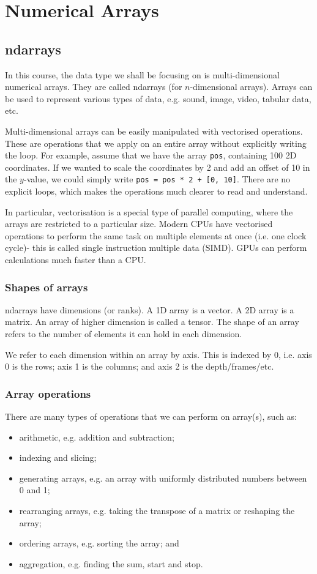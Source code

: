 \documentclass[a4paper, openany]{memoir}
\begin{document}
    \chapter{Numerical Arrays}
    \section{ndarrays}
    In this course, the data type we shall be focusing on is multi-dimensional numerical arrays. They are called ndarrays (for $n$-dimensional arrays). Arrays can be used to represent various types of data, e.g. sound, image, video, tabular data, etc.

    Multi-dimensional arrays can be easily manipulated with vectorised operations. These are operations that we apply on an entire array without explicitly writing the loop. For example, assume that we have the array \texttt{pos}, containing 100 2D coordinates. If we wanted to scale the coordinates by 2 and add an offset of 10 in the $y$-value, we could simply write \texttt{pos = pos * 2 + [0, 10]}. There are no explicit loops, which makes the operations much clearer to read and understand.

    In particular, vectorisation is a special type of parallel computing, where the arrays are restricted to a particular size. Modern CPUs have vectorised operations to perform the same task on multiple elements at once (i.e. one clock cycle)- this is called single instruction multiple data (SIMD). GPUs can perform calculations much faster than a CPU.

    \subsection{Shapes of arrays}
    ndarrays have dimensions (or ranks). A 1D array is a vector. A 2D array is a matrix. An array of higher dimension is called a tensor. The shape of an array refers to the number of elements it can hold in each dimension.

    We refer to each dimension within an array by axis. This is indexed by 0, i.e. axis 0 is the rows; axis 1 is the columns; and axis 2 is the depth/frames/etc.

    \subsection{Array operations}
    There are many types of operations that we can perform on array(s), such as:
    \begin{itemize}
        \item arithmetic, e.g. addition and subtraction;
        \item indexing and slicing;
        \item generating arrays, e.g. an array with uniformly distributed numbers between 0 and 1;
        \item rearranging arrays, e.g. taking the transpose of a matrix or reshaping the array;
        \item ordering arrays, e.g. sorting the array; and
        \item aggregation, e.g. finding the sum, start and stop.
    \end{itemize}
\end{document}
